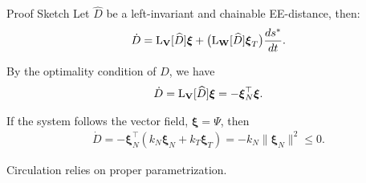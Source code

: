\begin{frame}{Proof Sketch}
    Let $\widehat{D}$ be a left-invariant and chainable EE-distance, then:
    \begin{align*}
        \dot{D} = \operatorname{L}_\mathbf{V}[\widehat{D}]\boldsymbol{\xi} + \bigl(\operatorname{L}_\mathbf{W}[\widehat{D}]\boldsymbol{\xi}_T\bigr)\frac{ds^*}{dt}.
    \end{align*}

    By the optimality condition of $D$, we have
    \begin{align*}
        \dot{D} = \operatorname{L}_\mathbf{V}[\widehat{D}]\boldsymbol{\xi} = -\boldsymbol{\xi}_N^\top\boldsymbol{\xi}.
    \end{align*}

    If the system follows the vector field, $\boldsymbol{\xi}=\Psi$, then
    \begin{align*}
        \dot{D} = -\boldsymbol{\xi}_N^\top(k_N\boldsymbol{\xi}_N + k_T\boldsymbol{\xi}_T)
         =-k_N\|\boldsymbol{\xi}_N\|^2 \le 0.
    \end{align*}

    Circulation relies on proper parametrization.
    
\end{frame}

